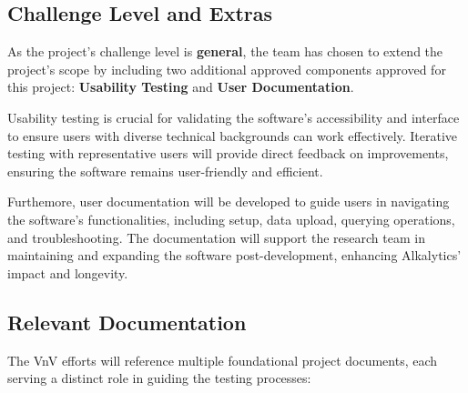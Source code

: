 \documentclass[12pt, titlepage]{article}
\begin{document}
\subsection{Challenge Level and Extras}

As the project's challenge level is \textbf{general}, the team has chosen to
extend the project’s scope by including two additional approved components
approved for this project: \textbf{Usability Testing} and \textbf{User
Documentation}.
\newline

\noindent Usability testing is crucial for validating the software’s
accessibility and interface to ensure users with diverse technical backgrounds
can work effectively. Iterative testing with representative users will provide
direct feedback on improvements, ensuring the software remains user-friendly and
efficient. \newline 

\noindent Furthemore, user documentation will be developed to guide users in
navigating the software’s functionalities, including setup, data upload,
querying operations, and troubleshooting. The documentation will support the
research team in maintaining and expanding the software post-development,
enhancing Alkalytics' impact and longevity.

\subsection{Relevant Documentation}

The VnV efforts will reference multiple foundational project documents, each
serving a distinct role in guiding the testing processes:
\end{document}
